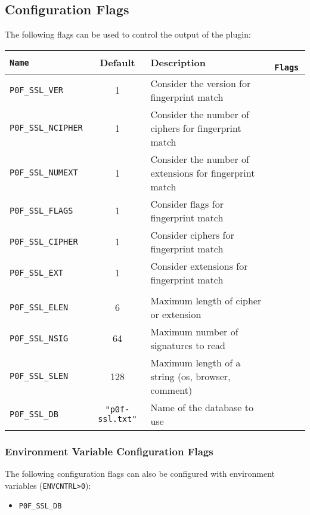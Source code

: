 \documentclass[documentation]{subfiles}
\begin{document}
\subsection{Configuration Flags}
The following flags can be used to control the output of the plugin:
\begin{longtable}{>{\tt}lcl>{\tt\small}l}
    \toprule
    {\bf Name} & {\bf Default} & {\bf Description} & {\bf Flags}\\
    \midrule\endhead%
    P0F\_SSL\_VER     &    1 & Consider the version for fingerprint match              & \\
    P0F\_SSL\_NCIPHER &    1 & Consider the number of ciphers for fingerprint match    & \\
    P0F\_SSL\_NUMEXT  &    1 & Consider the number of extensions for fingerprint match & \\
    P0F\_SSL\_FLAGS   &    1 & Consider flags for fingerprint match                    & \\
    P0F\_SSL\_CIPHER  &    1 & Consider ciphers for fingerprint match                  & \\
    P0F\_SSL\_EXT     &    1 & Consider extensions for fingerprint match               & \\
    \\
    P0F\_SSL\_ELEN    &    6 & Maximum length of cipher or extension                   & \\
    P0F\_SSL\_NSIG    &   64 & Maximum number of signatures to read                    & \\
    P0F\_SSL\_SLEN    &  128 & Maximum length of a string (os, browser, comment)       & \\
    P0F\_SSL\_DB      & {\tt\small "p0f-ssl.txt"}
                             & Name of the database to use                             & \\
    \bottomrule
\end{longtable}

\subsubsection{Environment Variable Configuration Flags}
The following configuration flags can also be configured with environment variables ({\tt ENVCNTRL>0}):
\begin{itemize}
    \item {\tt P0F\_SSL\_DB}
\end{itemize}
\end{document}
